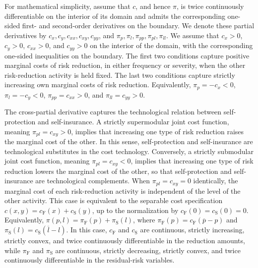 \documentclass[a4paper,12pt]{article}
\begin{document}
For mathematical simplicity, assume that $c$, and hence $\pi$, is twice continuously differentiable on the interior of its domain and admits the corresponding one-sided first- and second-order derivatives on the boundary. We denote these partial derivatives by $c_x,c_y,c_{xx},c_{xy},c_{yy}$, and $\pi_p,\pi_l,\pi_{pp},\pi_{pl},\pi_{ll}$. We assume that $c_x>0$, $c_y>0$, $c_{xx}>0$, and $c_{yy}>0$ on the interior of the domain, with the corresponding one-sided inequalities on the boundary. The first two conditions capture positive marginal costs of risk reduction, in either frequency or severity, when the other risk-reduction activity is held fixed. The last two conditions capture strictly increasing own marginal costs of risk reduction. Equivalently, $\pi_p=-c_x<0$, $\pi_l=-c_y<0$, $\pi_{pp}=c_{xx}>0$, and $\pi_{ll}=c_{yy}>0$.

The cross-partial derivative captures the technological relation between self-protection and self-insurance. A strictly supermodular joint cost function, meaning $\pi_{pl}=c_{xy}>0$, implies that increasing one type of risk reduction raises the marginal cost of the other. In this sense, self-protection and self-insurance are technological substitutes in the cost technology. Conversely, a strictly submodular joint cost function, meaning $\pi_{pl}=c_{xy}<0$, implies that increasing one type of risk reduction lowers the marginal cost of the other, so that self-protection and self-insurance are technological complements. When $\pi_{pl}=c_{xy}=0$ identically, the marginal cost of each risk-reduction activity is independent of the level of the other activity. This case is equivalent to the separable cost specification $c\left(x,y\right)=c_{\text{F}}\left(x\right)+c_{\text{S}}\left(y\right)$, up to the normalization by $c_{\text{F}}\left(0\right)=c_{\text{S}}\left(0\right)=0$. Equivalently, $\pi\left(p,l\right)=\pi_{\text{F}}\left(p\right)+\pi_{\text{S}}\left(l\right)$, where $\pi_{\text{F}}\left(p\right)=c_{\text{F}}\left(\overline{p}-p\right)$ and $\pi_{\text{S}}\left(l\right)=c_{\text{S}}\left(\overline{l}-l\right)$. In this case, $c_{\text{F}}$ and $c_{\text{S}}$ are continuous, strictly increasing, strictly convex, and twice continuously differentiable in the reduction amounts, while $\pi_{\text{F}}$ and $\pi_{\text{S}}$ are continuous, strictly decreasing, strictly convex, and twice continuously differentiable in the residual-risk variables.
\end{document}
